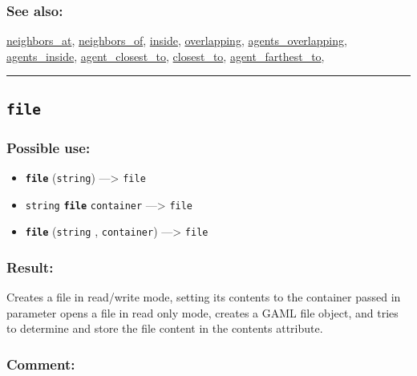 \documentclass[]{book}
\providecommand{\tightlist}{%
  \setlength{\itemsep}{0pt}\setlength{\parskip}{0pt}}
\theoremstyle{definition}
\theoremstyle{definition}
\theoremstyle{definition}
\theoremstyle{remark}
\begin{document}
\subsubsection{See also:}\label{see-also-92}

\href{OperatorsNR\#neighbors_at}{neighbors\_at},
\href{OperatorsNR\#neighbors_of}{neighbors\_of},
\href{OperatorsIM\#inside}{inside},
\href{OperatorsNR\#overlapping}{overlapping},
\href{OperatorsAA\#agents_overlapping}{agents\_overlapping},
\href{OperatorsAA\#agents_inside}{agents\_inside},
\href{OperatorsAA\#agent_closest_to}{agent\_closest\_to},
\href{OperatorsBC\#closest_to}{closest\_to},
\href{OperatorsAA\#agent_farthest_to}{agent\_farthest\_to},

\begin{center}\rule{0.5\linewidth}{\linethickness}\end{center}

\subsection{\texorpdfstring{\texttt{file}}{file}}\label{file}

\subsubsection{Possible use:}\label{possible-use-164}

\begin{itemize}
\tightlist
\item
  \textbf{\texttt{file}} (\texttt{string}) ---\textgreater{}
  \texttt{file}
\item
  \texttt{string} \textbf{\texttt{file}} \texttt{container}
  ---\textgreater{} \texttt{file}
\item
  \textbf{\texttt{file}} (\texttt{string} , \texttt{container})
  ---\textgreater{} \texttt{file}
\end{itemize}

\subsubsection{Result:}\label{result-158}

Creates a file in read/write mode, setting its contents to the container
passed in parameter opens a file in read only mode, creates a GAML file
object, and tries to determine and store the file content in the
contents attribute.

\subsubsection{Comment:}\label{comment-36}
\end{document}
